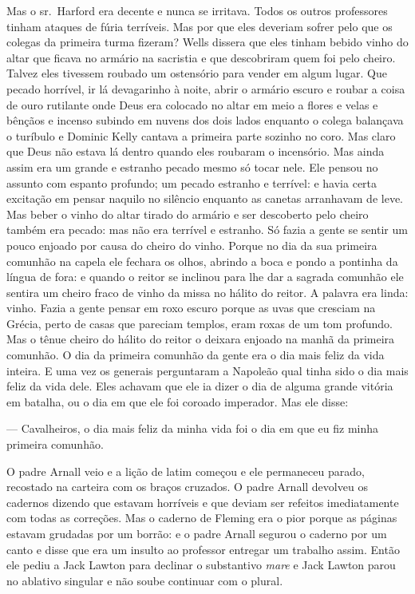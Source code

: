 Mas o sr.~Harford era decente e nunca se irritava. Todos os outros
professores tinham ataques de fúria terríveis. Mas por que eles
deveriam sofrer pelo que os colegas da primeira turma fizeram? Wells
dissera que eles tinham bebido vinho do altar que ficava no armário na
sacristia e que descobriram quem foi pelo cheiro. Talvez eles tivessem
roubado um ostensório para vender em algum lugar. Que pecado horrível,
ir lá devagarinho à noite, abrir o armário escuro e roubar a coisa de
ouro rutilante onde Deus era colocado no altar em meio a flores e velas
e bênçãos e incenso subindo em nuvens dos dois lados enquanto o colega
balançava o turíbulo e Dominic Kelly cantava a primeira parte sozinho
no coro. Mas claro que Deus não estava lá dentro quando eles roubaram o
incensório. Mas ainda assim era um grande e estranho pecado mesmo só
tocar nele. Ele pensou no assunto com espanto profundo; um pecado
estranho e terrível: e havia certa excitação em pensar naquilo no
silêncio enquanto as canetas arranhavam de leve. Mas beber o vinho do
altar tirado do armário e ser descoberto pelo cheiro também era pecado:
mas não era terrível e estranho. Só fazia a gente se sentir um pouco
enjoado por causa do cheiro do vinho. Porque no dia da sua primeira
comunhão na capela ele fechara os olhos, abrindo a boca e pondo a
pontinha da língua de fora: e quando o reitor se inclinou para lhe dar
a sagrada comunhão ele sentira um cheiro fraco de vinho da missa no
hálito do reitor. A palavra era linda: vinho. Fazia a gente pensar em
roxo escuro porque as uvas que cresciam na Grécia, perto de casas que
pareciam templos, eram roxas de um tom profundo. Mas o tênue cheiro do
hálito do reitor o deixara enjoado na manhã da primeira comunhão. O dia
da primeira comunhão da gente era o dia mais feliz da vida inteira. E
uma vez os generais perguntaram a Napoleão qual tinha sido o dia mais
feliz da vida dele. Eles achavam que ele ia dizer o dia de alguma
grande vitória em batalha, ou o dia em que ele foi coroado imperador.
Mas ele disse:

 --- Cavalheiros, o dia mais feliz da minha vida foi o dia em que eu fiz
minha primeira comunhão.

O padre Arnall veio e a lição de latim começou e ele permaneceu parado,
recostado na carteira com os braços cruzados. O padre Arnall devolveu
os cadernos dizendo que estavam horríveis e que deviam ser refeitos
imediatamente com todas as correções. Mas o caderno de Fleming era o
pior porque as páginas estavam grudadas por um borrão: e o padre Arnall
segurou o caderno por um canto e disse que era um insulto ao professor
entregar um trabalho assim. Então ele pediu a Jack Lawton para declinar
o substantivo \textit{mare} e Jack Lawton parou no ablativo singular e
não soube continuar com o plural.

